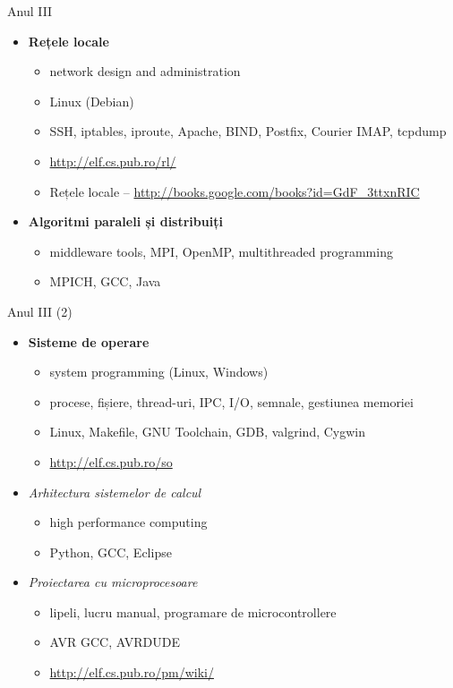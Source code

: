 \documentclass{beamer}
\begin{document}
\begin{frame}{Anul III}
	\begin{itemize}
		\item \textbf{Rețele locale}
			\begin{itemize}
				\item network design and administration
				\item Linux (Debian)
				\item SSH, iptables, iproute, Apache, BIND, Postfix, Courier
				IMAP, tcpdump
				\item \url{http://elf.cs.pub.ro/rl/}
				\item Rețele locale --
				\url{http://books.google.com/books?id=GdF_3ttxnRIC}
			\end{itemize}
		\item \textbf{Algoritmi paraleli și distribuiți}
			\begin{itemize}
				\item middleware tools, MPI, OpenMP, multithreaded programming
				\item MPICH, GCC, Java
			\end{itemize}
	\end{itemize}
\end{frame}

\begin{frame}{Anul III (2)}
	\begin{itemize}
		\item \textbf{Sisteme de operare}
			\begin{itemize}
				\item system programming (Linux, Windows)
				\item procese, fișiere, thread-uri, IPC, I/O, semnale,
				gestiunea memoriei
				\item Linux, Makefile, GNU Toolchain, GDB, valgrind, Cygwin
				\item \url{http://elf.cs.pub.ro/so}
			\end{itemize}
		\item \textit{Arhitectura sistemelor de calcul}
			\begin{itemize}
				\item high performance computing
				\item Python, GCC, Eclipse
			\end{itemize}
		\item \textit{Proiectarea cu microprocesoare}
			\begin{itemize}
				\item lipeli, lucru manual, programare de microcontrollere
				\item AVR GCC, AVRDUDE
				\item \url{http://elf.cs.pub.ro/pm/wiki/}
			\end{itemize}
	\end{itemize}
\end{frame}
\end{document}
